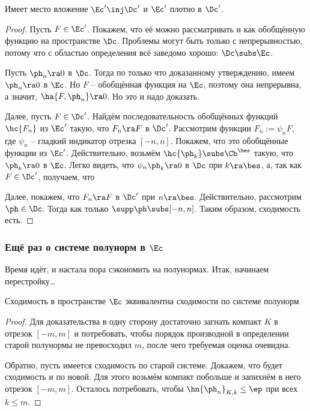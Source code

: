 \documentclass[a4paper]{article}
\begin{document}
\begin{stm}
Имеет место вложение $\Ec' \inj \Dc'$ и $\Ec'$ плотно в $\Dc'$.
\end{stm}
\begin{proof}
Пусть $F \in \Ec'$. Покажем, что её можно рассматривать и как обобщённую функцию
на пространстве $\Dc$. Проблемы могут быть только с непрерывностью, потому что
с областью определения всё заведомо хорошо: $\Dc \subs \Ec$.

Пусть $\ph_n \ra 0$ в $\Dc$. Тогда по только что доказанному утверждению,
имеем $\ph_n\ra 0$ в $\Ec$. Но $F$ -- обобщённая функция на $\Ec$, поэтому она
непрерывна, а значит, $\ha{F,\ph_n} \ra 0$. Но это и надо доказать.

Далее, пусть $F \in \Dc'$. Найдём последовательность обобщённых функций $\hc{F_n}$ из $\Ec'$
такую, что $F_n \ra F$ в $\Dc'$. Рассмотрим функции $F_n := \psi_n F$,
где $\psi_n$ -- гладкий индикатор отрезка $[-n,n]$. Покажем, что это обобщённые функции из $\Ec'$.
Действительно, возьмём $\hc{\ph_k} \subs \Cb^\bes$ такую, что $\ph_k \ra 0$ в $\Ec$.
Легко видеть, что $\psi_n\ph_k \ra 0$ в $\Dc$ при $k \ra \bes$, а, так как $F \in \Dc'$, получаем, что

Далее, покажем, что $F_n \ra F$ в $\Dc'$ при $n \ra \bes$.
Действительно, рассмотрим $\ph \in \Dc$. Тогда
как только $\supp \ph \subs [-n,n]$. Таким образом, сходимость есть.
\end{proof}


\subsubsection{Ещё раз о системе полунорм в $\Ec$}

Время идёт, и настала пора сэкономить на полунормах. Итак, начинаем перестройку\dots

\begin{lemma}
Сходимость в пространстве $\Ec$ эквивалентна сходимости по системе полунорм
\end{lemma}
\begin{proof}
Для доказательства в одну сторону достаточно загнать компакт $K$ в отрезок $[-m,m]$
и потребовать, чтобы порядок производной в определении старой полунормы не превосходил $m$,
после чего требуемая оценка очевидна.

Обратно, пусть имеется сходимость по старой системе. Докажем, что будет сходимость и по новой.
Для этого возьмём компакт побольше и запихнём в него отрезок $[-m,m]$. Осталось потребовать,
чтобы $\hn{\ph_n}_{K,k} \le \ep$ при всех $k \le m$.
\end{proof}
\end{document}
